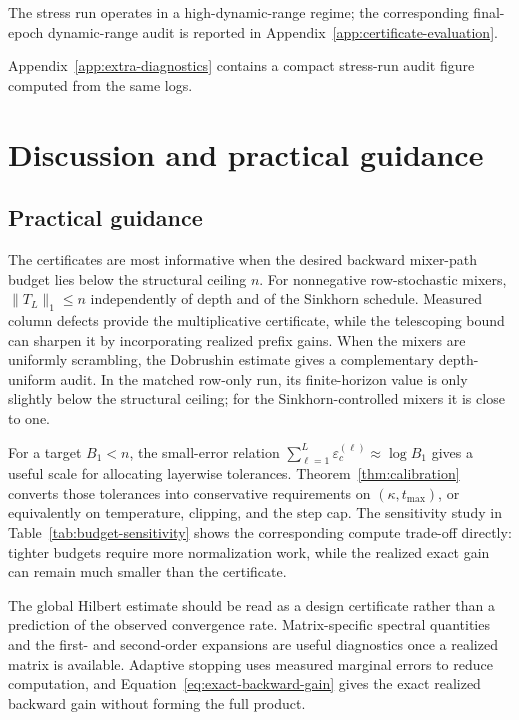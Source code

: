 \documentclass[10pt]{article}
\numberwithin{equation}{section}
\theoremstyle{plain}
\theoremstyle{definition}
\theoremstyle{remark}
\begin{document}
The stress run operates in a high-dynamic-range regime; the corresponding
final-epoch dynamic-range audit is reported in
Appendix~\ref{app:certificate-evaluation}.

Appendix~\ref{app:extra-diagnostics} contains a compact stress-run audit figure computed
from the same logs.
\FloatBarrier

\section{Discussion and practical guidance}\label{sec:discussion}
\subsection{Practical guidance}\label{subsec:guidance}
The certificates are most informative when the desired backward mixer-path budget
lies below the structural ceiling \(n\). For nonnegative row-stochastic mixers,
\(\|T_L\|_1\le n\) independently of depth and of the Sinkhorn schedule. Measured
column defects provide the multiplicative certificate, while the telescoping bound
can sharpen it by incorporating realized prefix gains. When the mixers are uniformly
scrambling, the Dobrushin estimate gives a complementary depth-uniform audit. In the
matched row-only run, its finite-horizon value is only slightly below the structural
ceiling; for the Sinkhorn-controlled mixers it is close to one.

For a target \(B_1<n\), the small-error relation
\(\sum_{\ell=1}^L\varepsilon_c^{(\ell)}\approx\log B_1\) gives a useful scale for
allocating layerwise tolerances. Theorem~\ref{thm:calibration} converts those
tolerances into conservative requirements on \((\kappa,t_{\max})\), or equivalently
on temperature, clipping, and the step cap. The sensitivity study in
Table~\ref{tab:budget-sensitivity} shows the corresponding compute trade-off directly:
tighter budgets require more normalization work, while the realized exact gain can
remain much smaller than the certificate.

The global Hilbert estimate should be read as a design certificate rather than a
prediction of the observed convergence rate. Matrix-specific spectral quantities and
the first- and second-order expansions are useful diagnostics once a realized matrix
is available. Adaptive stopping uses measured marginal errors to reduce computation,
and Equation~\eqref{eq:exact-backward-gain} gives the exact realized backward gain
without forming the full product.
\end{document}
